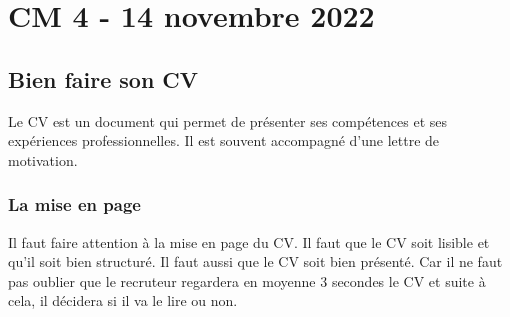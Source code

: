 \documentclass[12pt, a4paper]{article}
\begin{document}
\newpage

\section{CM 4 - 14 novembre 2022}
\subsection{Bien faire son CV}

Le CV est un document qui permet de présenter ses compétences et ses expériences
professionnelles. Il est souvent accompagné d'une lettre de motivation.\\

\subsubsection{La mise en page}

Il faut faire attention à la mise en page du CV. Il faut que le CV soit lisible
et qu'il soit bien structuré. Il faut aussi que le CV soit bien présenté. Car
il ne faut pas oublier que le recruteur regardera en moyenne 3 secondes le CV
et suite à cela, il décidera si il va le lire ou non.\\
\end{document}
